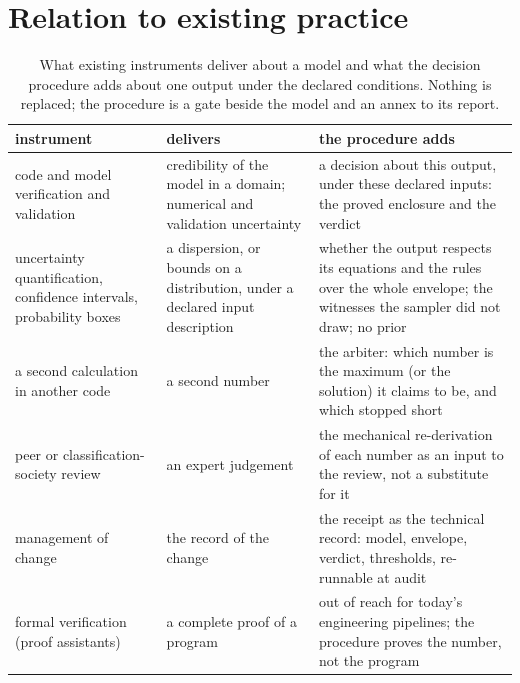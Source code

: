 \documentclass[preprint,11pt,authoryear]{elsarticle}
\begin{document}
\section{Relation to existing practice}\label{sec:related}

\begin{table}[t]
\centering\footnotesize
\caption{What existing instruments deliver about a model and what the decision procedure adds about one output under the declared conditions. Nothing is replaced; the procedure is a gate beside the model and an annex to its report.}
\label{tab:related}
\begin{tabular}{p{42mm}p{40mm}p{58mm}}
\toprule
instrument & delivers & the procedure adds \\
\midrule
code and model verification and validation \citep{asme2009,nasa2016,oberkampf2010} & credibility of the model in a domain; numerical and validation uncertainty & a decision about this output, under these declared inputs: the proved enclosure and the verdict \\
uncertainty quantification, confidence intervals, probability boxes \citep{ferson1996,beer2013} & a dispersion, or bounds on a distribution, under a declared input description & whether the output respects its equations and the rules over the whole envelope; the witnesses the sampler did not draw; no prior \\
a second calculation in another code & a second number & the arbiter: which number is the maximum (or the solution) it claims to be, and which stopped short \\
peer or classification-society review & an expert judgement & the mechanical re-derivation of each number as an input to the review, not a substitute for it \\
management of change \citep{anp2007} & the record of the change & the receipt as the technical record: model, envelope, verdict, thresholds, re-runnable at audit \\
formal verification (proof assistants) & a complete proof of a program & out of reach for today's engineering pipelines; the procedure proves the number, not the program \\
\bottomrule
\end{tabular}
\end{table}
\end{document}

